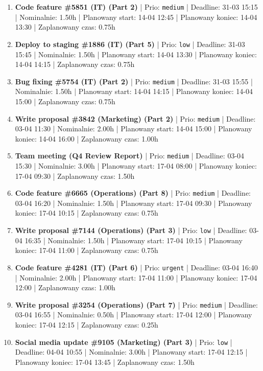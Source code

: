 {\begin{enumerate}
  \item [\textbf{14643}] \textbf{Code feature \#5851 (IT) (Part 2)} | Prio: \texttt{medium} | Deadline: 31-03 15:15 | Nominalnie: 1.50h | Planowany start: 14-04 12:45 | Planowany koniec: 14-04 13:30 | Zaplanowany czas: 0.75h
  \item [\textbf{14697}] \textbf{Deploy to staging \#1886 (IT) (Part 5)} | Prio: \texttt{low} | Deadline: 31-03 15:45 | Nominalnie: 1.50h | Planowany start: 14-04 13:30 | Planowany koniec: 14-04 14:15 | Zaplanowany czas: 0.75h
  \item [\textbf{14631}] \textbf{Bug fixing \#5754 (IT) (Part 2)} | Prio: \texttt{medium} | Deadline: 31-03 15:55 | Nominalnie: 1.50h | Planowany start: 14-04 14:15 | Planowany koniec: 14-04 15:00 | Zaplanowany czas: 0.75h
  \item [\textbf{14673}] \textbf{Write proposal \#3842 (Marketing) (Part 2)} | Prio: \texttt{medium} | Deadline: 03-04 11:30 | Nominalnie: 2.00h | Planowany start: 14-04 15:00 | Planowany koniec: 14-04 16:00 | Zaplanowany czas: 1.00h
  \item [\textbf{14635}] \textbf{Team meeting (Q4 Review Report)} | Prio: \texttt{medium} | Deadline: 03-04 15:30 | Nominalnie: 3.00h | Planowany start: 17-04 08:00 | Planowany koniec: 17-04 09:30 | Zaplanowany czas: 1.50h
  \item [\textbf{14667}] \textbf{Code feature \#6665 (Operations) (Part 8)} | Prio: \texttt{medium} | Deadline: 03-04 16:20 | Nominalnie: 1.50h | Planowany start: 17-04 09:30 | Planowany koniec: 17-04 10:15 | Zaplanowany czas: 0.75h
  \item [\textbf{14702}] \textbf{Write proposal \#7144 (Operations) (Part 3)} | Prio: \texttt{low} | Deadline: 03-04 16:35 | Nominalnie: 1.50h | Planowany start: 17-04 10:15 | Planowany koniec: 17-04 11:00 | Zaplanowany czas: 0.75h
  \item [\textbf{14604}] \textbf{Code feature \#4281 (IT) (Part 6)} | Prio: \texttt{urgent} | Deadline: 03-04 16:40 | Nominalnie: 2.00h | Planowany start: 17-04 11:00 | Planowany koniec: 17-04 12:00 | Zaplanowany czas: 1.00h
  \item [\textbf{14663}] \textbf{Write proposal \#3254 (Operations) (Part 7)} | Prio: \texttt{medium} | Deadline: 03-04 16:55 | Nominalnie: 0.50h | Planowany start: 17-04 12:00 | Planowany koniec: 17-04 12:15 | Zaplanowany czas: 0.25h
  \item [\textbf{14698}] \textbf{Social media update \#9105 (Marketing) (Part 3)} | Prio: \texttt{low} | Deadline: 04-04 10:55 | Nominalnie: 3.00h | Planowany start: 17-04 12:15 | Planowany koniec: 17-04 13:45 | Zaplanowany czas: 1.50h

\end{enumerate}}
